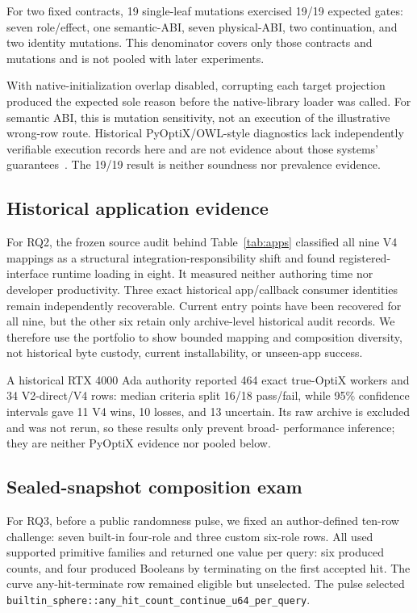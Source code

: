\documentclass[sigplan,screen,review,anonymous]{acmart}
\begin{document}
For two fixed contracts, 19 single-leaf mutations exercised 19/19 expected
gates: seven role/effect, one semantic-ABI, seven physical-ABI, two continuation,
and two identity mutations. This denominator covers only those contracts and
mutations and is not pooled with later experiments.

With native-initialization overlap disabled, corrupting each target projection
produced the expected sole reason before the native-library loader was called.
For semantic ABI, this is mutation sensitivity, not an
execution of the illustrative wrong-row route. Historical PyOptiX/OWL-style
diagnostics lack independently verifiable execution records here and are not
evidence about those systems' guarantees~\cite{nvidiaPyOptix,nvidiaOWL}. The
19/19 result is neither soundness nor prevalence evidence.

\subsection{Historical application evidence}

For RQ2, the frozen source audit behind Table~\ref{tab:apps} classified all
nine V4 mappings as a structural integration-responsibility shift and found
registered-interface runtime loading in eight. It measured neither authoring
time nor developer productivity. Three exact historical app/callback consumer
identities remain independently recoverable. Current entry points have been
recovered for all nine, but the other six retain only archive-level historical
audit records. We therefore use the portfolio to show bounded mapping and
composition diversity, not historical byte custody, current installability, or
unseen-app success.

A historical RTX 4000 Ada authority reported 464 exact true-OptiX workers and
34 V2-direct/V4 rows: median criteria split 16/18 pass/fail, while 95\%
confidence intervals gave 11 V4 wins, 10 losses, and 13 uncertain. Its raw
archive is excluded and was not rerun, so these results only prevent broad-
performance inference; they are neither PyOptiX evidence nor pooled below.

\subsection{Sealed-snapshot composition exam}
\label{sec:prospective}

For RQ3, before a public randomness pulse, we fixed an author-defined ten-row challenge:
seven built-in four-role and three custom six-role rows. All used supported
primitive families and returned one value per query: six produced counts, and
four produced Booleans by terminating on the first accepted hit. The curve
any-hit-terminate row remained eligible but unselected. The pulse selected
\nolinkurl{builtin_sphere::any_hit_count_continue_u64_per_query}.
\end{document}
